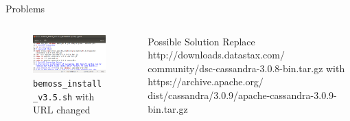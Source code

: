 \documentclass{beamer}
\begin{document}
\begin{frame}[fragile]{Problems}
	\begin{columns}[T]
		\begin{column}{0.5\textwidth}
			\begin{figure}
				\includegraphics[scale=0.25]{figs/datastaxURLFix.png}
				\caption{\texttt{bemoss\_install\_v3.5.sh} with URL changed}
			\end{figure}
		\end{column}
		\begin{column}{0.5\textwidth}
			\begin{block}{Possible Solution}
					Replace http://downloads.datastax.com/
					community/dsc-cassandra-3.0.8-bin.tar.gz with https://archive.apache.org/
					dist/cassandra/3.0.9/apache-cassandra-3.0.9-bin.tar.gz
			\end{block}
		\end{column}
	\end{columns}
\end{frame}
\end{document}
